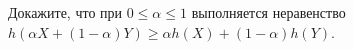 Докажите, что при $0 \le \alpha \le 1$ выполняется неравенство
$h(\alpha X + (1 - \alpha)Y) \ge \alpha h(X) + (1 - \alpha) h(Y)$.
